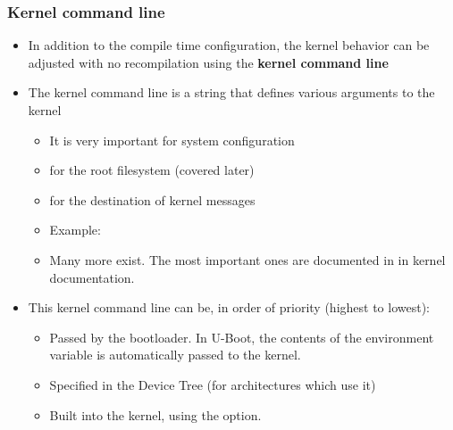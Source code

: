 \begin{frame}
  \frametitle{Kernel command line}
  \begin{itemize}
  \item In addition to the compile time configuration, the kernel
    behavior can be adjusted with no recompilation using the {\bf
      kernel command line}
  \item The kernel command line is a string that defines various
    arguments to the kernel
    \begin{itemize}
    \item It is very important for system configuration
    \item {} for the root filesystem (covered later)
    \item {} for the destination of kernel messages
    \item Example: 
    \item Many more exist. The most important ones are documented
          in  in kernel
          documentation.
    \end{itemize}
  \item This kernel command line can be, in order of priority (highest
    to lowest):
    \begin{itemize}
    \item Passed by the bootloader. In U-Boot, the contents of the
       environment variable is automatically passed to the
      kernel.
    \item Specified in the Device Tree (for architectures which use it)
    \item Built into the kernel, using the  option.
    \end{itemize}
  \end{itemize}
\end{frame}
